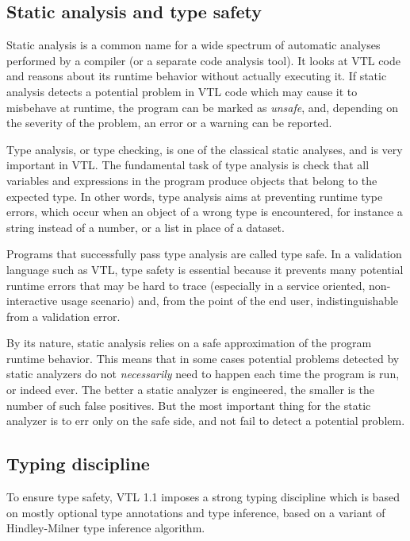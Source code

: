 \documentclass[droidmono,libertine,twoside,user,unofficial]{ecarticle}
\begin{document}
\subsection{Static analysis and type safety}

Static analysis is a common name for a wide spectrum of automatic
analyses performed by a compiler (or a separate code analysis tool).
It looks at VTL code and reasons about its runtime behavior without
actually executing it.  If static analysis detects a potential problem
in VTL code which may cause it to misbehave at runtime, the program
can be marked as \textit{unsafe}, and, depending on the severity of
the problem, an error or a warning can be reported.

Type analysis, or type checking, is one of the classical static
analyses, and is very important in VTL.  The fundamental task of type
analysis is check that all variables and expressions in the program
produce objects that belong to the expected type.  In other words,
type analysis aims at preventing runtime type errors, which occur when
an object of a wrong type is encountered, for instance a string
instead of a number, or a list in place of a dataset.

Programs that successfully pass type analysis are called type safe.
In a validation language such as VTL, type safety is essential because
it prevents many potential runtime errors that may be
hard to trace (especially in a service oriented, non-interactive usage
scenario) and, from the point of the end user, indistinguishable from
a validation error.

By its nature, static analysis relies on a safe approximation of the
program runtime behavior.  This means that in some cases potential
problems detected by static analyzers do not \emph{necessarily} need
to happen each time the program is run, or indeed ever.  The better a
static analyzer is engineered, the smaller is the number of such false
positives.  But the most important thing for the static analyzer is to
err only on the safe side, and not fail to detect a potential problem.


\subsection{Typing discipline}
\label{sec:typing-discipline-1}

To ensure type safety, VTL 1.1 imposes a strong typing discipline
which is based on mostly optional type annotations and type inference,
based on a variant of Hindley-Milner type inference algorithm.
\end{document}
